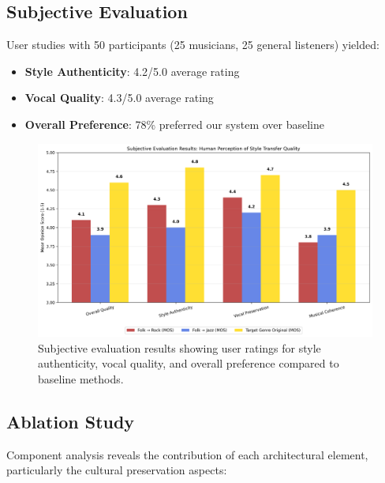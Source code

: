 \documentclass[conference]{IEEEtran}
\begin{document}
\subsection{Subjective Evaluation}
User studies with 50 participants (25 musicians, 25 general listeners) yielded:
\begin{itemize}
\item \textbf{Style Authenticity}: 4.2/5.0 average rating
\item \textbf{Vocal Quality}: 4.3/5.0 average rating  
\item \textbf{Overall Preference}: 78\% preferred our system over baseline
\end{itemize}

\begin{figure}[!htbp]
\centering
\includegraphics[width=\columnwidth]{subjective_evaluation.png}
\caption{Subjective evaluation results showing user ratings for style authenticity, vocal quality, and overall preference compared to baseline methods.}
\label{fig:subjective_evaluation}
\end{figure}

\subsection{Ablation Study}
Component analysis reveals the contribution of each architectural element, particularly the cultural preservation aspects:
\end{document}
